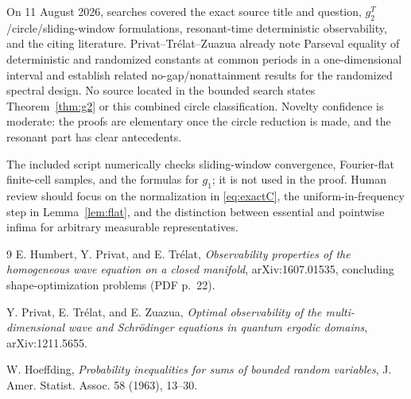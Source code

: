 \documentclass[11pt]{article}
\begin{document}
On 11 August 2026, searches covered the exact source title and question,
$g_2^T$/circle/sliding-window formulations, resonant-time deterministic
observability, and the citing literature.  Privat--Tr\'elat--Zuazua
\cite{ptz} already note Parseval equality of deterministic and randomized
constants at common periods in a one-dimensional interval and establish
related no-gap/nonattainment results for the randomized spectral design.
No source located in the bounded search states Theorem~\ref{thm:g2} or this
combined circle classification.  Novelty confidence is moderate: the proofs
are elementary once the circle reduction is made, and the resonant part has
clear antecedents.

The included script numerically checks sliding-window convergence,
Fourier-flat finite-cell samples, and the formulas for $g_1$; it is not used in
the proof.  Human review should focus on the normalization in
\eqref{eq:exactC}, the uniform-in-frequency step in Lemma~\ref{lem:flat}, and
the distinction between essential and pointwise infima for arbitrary
measurable representatives.

\begin{thebibliography}{9}
E. Humbert, Y. Privat, and E. Tr\'elat,
\emph{Observability properties of the homogeneous wave equation on a closed
manifold}, arXiv:1607.01535, concluding shape-optimization problems (PDF p.~22).

Y. Privat, E. Tr\'elat, and E. Zuazua,
\emph{Optimal observability of the multi-dimensional wave and Schr\"odinger
equations in quantum ergodic domains}, arXiv:1211.5655.

W. Hoeffding,
\emph{Probability inequalities for sums of bounded random variables},
J. Amer. Statist. Assoc. 58 (1963), 13--30.
\end{thebibliography}
\end{document}
